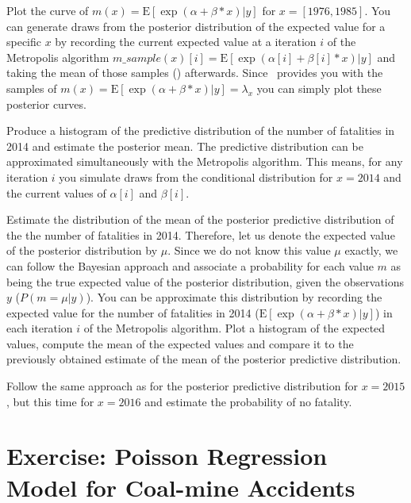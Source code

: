 Plot the curve of $m(x) = \text{E}[\exp(\alpha+\beta*x)|y]$ for $x = [1976,1985]$. 
You can generate draws from the posterior distribution of the expected value for a specific $x$ by recording the current expected value at a iteration $i$ of the Metropolis algorithm $m\_sample(x)[i] = \text{E}[\exp(\alpha[i]+\beta[i]*x)|y]$ and taking the mean of those samples () afterwards. Since \RevBayes~provides you with the samples of $m(x) = \text{E}[\exp(\alpha+\beta*x)|y] = \lambda_x$ you can simply plot these posterior curves.
 

 
Produce a histogram of the predictive distribution of the number of fatalities in 2014 and estimate the posterior mean. 
The predictive distribution can be approximated simultaneously with the Metropolis algorithm. 
This means, for any iteration $i$ you simulate draws from the conditional distribution for $x = 2014$ and the current values of $\alpha[i]$ and $\beta[i]$.
 
Estimate the distribution of the mean of the posterior predictive distribution of the the number of fatalities in 2014. 
Therefore, let us denote the expected value of the posterior distribution by $\mu$. 
Since we do not know this value $\mu$ exactly, we can follow the Bayesian approach and associate a probability for each value $m$ as being the true expected value of the posterior distribution, given the observations $y$ ($P(m = \mu|y)$).
You can be approximate this distribution by recording the expected value for the number of fatalities in 2014 ($\text{E}[\exp(\alpha+\beta*x)|y]$) in each iteration $i$ of the Metropolis algorithm. 
Plot a histogram of the expected values, compute the mean of the expected values and compare it to the previously obtained estimate of the mean of the posterior predictive distribution.
 
Follow the same approach as for the posterior predictive distribution for $x = 2015$, but this time for $x = 2016$ and estimate the probability of no fatality. 
 
 
 
 

\newpage
\FloatBarrier
\section{Exercise: Poisson Regression Model for Coal-mine Accidents}
 
